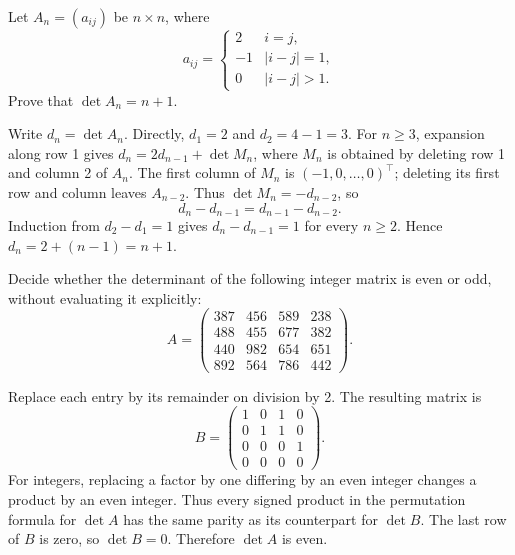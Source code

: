 \begin{problem}\label{ex:05:tridiagonal}
Let \(A_n=(a_{ij})\) be \(n\times n\), where
\[
a_{ij}=\begin{cases}2&i=j,\\-1&|i-j|=1,\\0&|i-j|>1.\end{cases}
\]
Prove that \(\det A_n=n+1\).
\end{problem}
\begin{solution}
Write \(d_n=\det A_n\). Directly, \(d_1=2\) and
\(d_2=4-1=3\). For \(n\geqslant3\), expansion along row 1 gives
\(d_n=2d_{n-1}+\det M_n\), where \(M_n\) is obtained by deleting
row 1 and column 2 of \(A_n\). The first column of \(M_n\) is
\((-1,0,\ldots,0)^\top\); deleting its first row and column leaves \(A_{n-2}\).
Thus \(\det M_n=-d_{n-2}\), so
\[
d_n-d_{n-1}=d_{n-1}-d_{n-2}.
\]
Induction from \(d_2-d_1=1\) gives \(d_n-d_{n-1}=1\) for every
\(n\geqslant2\). Hence \(d_n=2+(n-1)=n+1\).
\end{solution}

\begin{problem}\label{ex:05:parity}
Decide whether the determinant of the following integer matrix is even or odd,
without evaluating it explicitly:
\[
A=\begin{pmatrix}
387&456&589&238\\488&455&677&382\\440&982&654&651\\892&564&786&442
\end{pmatrix}.
\]
\end{problem}
\begin{solution}
Replace each entry by its remainder on division by 2. The resulting matrix is
\[
B=\begin{pmatrix}1&0&1&0\\0&1&1&0\\0&0&0&1\\0&0&0&0\end{pmatrix}.
\]
For integers, replacing a factor by one differing by an even integer changes
a product by an even integer. Thus every signed product in the permutation
formula for \(\det A\) has the same parity as its counterpart for \(\det B\).
The last row of \(B\) is zero, so \(\det B=0\). Therefore \(\det A\) is even.
\end{solution}

